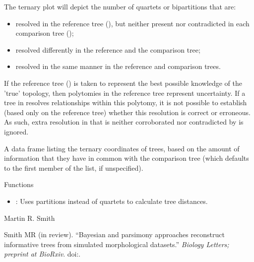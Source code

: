 \documentclass[a4paper]{book}
\begin{document}
\begin{Details}\relax
The ternary plot will depict the number of quartets or bipartitions that are:
\begin{itemize}

\item resolved in the reference tree (), but neither present nor contradicted
in each comparison tree ();
\item resolved differently in the reference and the comparison tree;
\item resolved in the same manner in the reference and comparison trees.

\end{itemize}


If the reference tree () is taken to represent the best possible knowledge
of the 'true' topology, then polytomies in the reference tree represent
uncertainty.  If a tree in  resolves relationships within this
polytomy, it is not possible to establish (based only on the reference tree)
whether this resolution is correct or erroneous.  As such, extra resolution
in  that is neither corroborated nor contradicted by  is ignored.
\end{Details}
%
\begin{Value}
A data frame listing the ternary coordinates of trees, based on the
amount of information that they have in common with the comparison
tree (which defaults to the first member of the list, if unspecified).
\end{Value}
%
\begin{Section}{Functions}
\begin{itemize}

\item {}: Uses partitions instead of quartets to calculate
tree distances.

\end{itemize}
\end{Section}
%
\begin{Author}\relax
Martin R. Smith
\end{Author}
%
\begin{References}\relax
Smith MR (in review).
``Bayesian and parsimony approaches reconstruct informative trees from simulated morphological datasets.''
\emph{Biology Letters; preprint at BioRxiv}.
doi:\nobreakspace{}.
\end{References}
%
\end{document}
